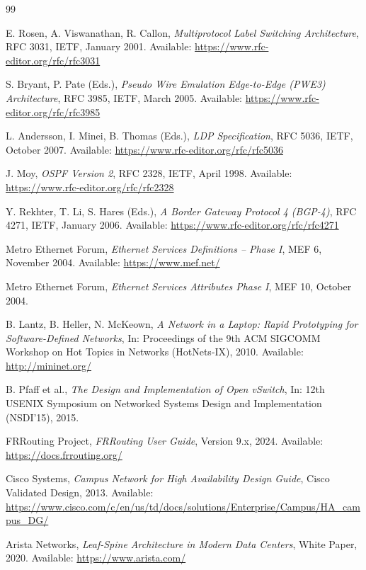 \begin{thebibliography}{99}

E. Rosen, A. Viswanathan, R. Callon,
\textit{Multiprotocol Label Switching Architecture},
RFC 3031, IETF, January 2001.
Available: \url{https://www.rfc-editor.org/rfc/rfc3031}

S. Bryant, P. Pate (Eds.),
\textit{Pseudo Wire Emulation Edge-to-Edge (PWE3) Architecture},
RFC 3985, IETF, March 2005.
Available: \url{https://www.rfc-editor.org/rfc/rfc3985}

L. Andersson, I. Minei, B. Thomas (Eds.),
\textit{LDP Specification},
RFC 5036, IETF, October 2007.
Available: \url{https://www.rfc-editor.org/rfc/rfc5036}

J. Moy,
\textit{OSPF Version 2},
RFC 2328, IETF, April 1998.
Available: \url{https://www.rfc-editor.org/rfc/rfc2328}

Y. Rekhter, T. Li, S. Hares (Eds.),
\textit{A Border Gateway Protocol 4 (BGP-4)},
RFC 4271, IETF, January 2006.
Available: \url{https://www.rfc-editor.org/rfc/rfc4271}

Metro Ethernet Forum,
\textit{Ethernet Services Definitions -- Phase I},
MEF 6, November 2004.
Available: \url{https://www.mef.net/}

Metro Ethernet Forum,
\textit{Ethernet Services Attributes Phase I},
MEF 10, October 2004.

B. Lantz, B. Heller, N. McKeown,
\textit{A Network in a Laptop: Rapid Prototyping for Software-Defined Networks},
In: Proceedings of the 9th ACM SIGCOMM Workshop on Hot Topics in Networks (HotNets-IX), 2010.
Available: \url{http://mininet.org/}

B. Pfaff et al.,
\textit{The Design and Implementation of Open vSwitch},
In: 12th USENIX Symposium on Networked Systems Design and Implementation (NSDI'15), 2015.

FRRouting Project,
\textit{FRRouting User Guide}, Version 9.x, 2024.
Available: \url{https://docs.frrouting.org/}

Cisco Systems,
\textit{Campus Network for High Availability Design Guide},
Cisco Validated Design, 2013.
Available: \url{https://www.cisco.com/c/en/us/td/docs/solutions/Enterprise/Campus/HA_campus_DG/}

Arista Networks,
\textit{Leaf-Spine Architecture in Modern Data Centers},
White Paper, 2020.
Available: \url{https://www.arista.com/}


\end{thebibliography}
